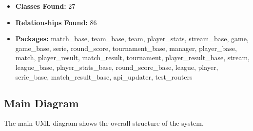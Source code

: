 \documentclass[11pt,a4paper]{article}
\begin{document}
\begin{itemize}
    \item \textbf{Classes Found:} 27
    \item \textbf{Relationships Found:} 86
    \item \textbf{Packages:} match\_base, team\_base, team, player\_stats, stream\_base, game, game\_base, serie, round\_score, tournament\_base, manager, player\_base, match, player\_result, match\_result, tournament, player\_result\_base, stream, league\_base, player\_stats\_base, round\_score\_base, league, player, serie\_base, match\_result\_base, api\_updater, test\_routers
\end{itemize}

\subsection{Main Diagram}

The main UML diagram shows the overall structure of the system.
\end{document}
